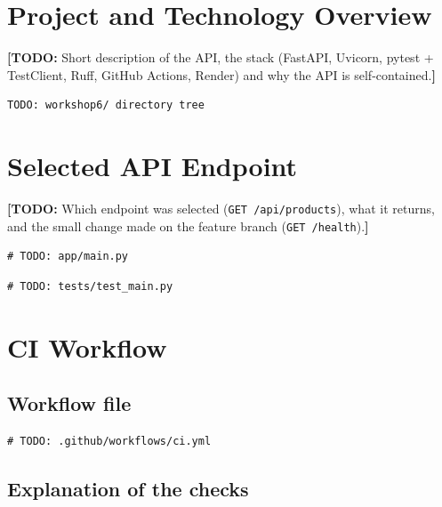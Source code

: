 \documentclass[10pt,a4paper]{article}
\newcommand{\todo}[1]{{\color{todored}\textbf{[TODO:} #1\textbf{]}}}
\begin{document}
\section{Project and Technology Overview}

\todo{Short description of the API, the stack (FastAPI, Uvicorn, pytest +
TestClient, Ruff, GitHub Actions, Render) and why the API is self-contained.}

\begin{lstlisting}[style=plain]
TODO: workshop6/ directory tree
\end{lstlisting}

\section{Selected API Endpoint}

\todo{Which endpoint was selected (\texttt{GET /api/products}), what it
returns, and the small change made on the feature branch
(\texttt{GET /health}).}

\begin{lstlisting}[style=py]
# TODO: app/main.py
\end{lstlisting}

\begin{lstlisting}[style=py]
# TODO: tests/test_main.py
\end{lstlisting}

\section{CI Workflow}

\subsection{Workflow file}

\begin{lstlisting}[style=yml]
# TODO: .github/workflows/ci.yml
\end{lstlisting}

\subsection{Explanation of the checks}
\end{document}
